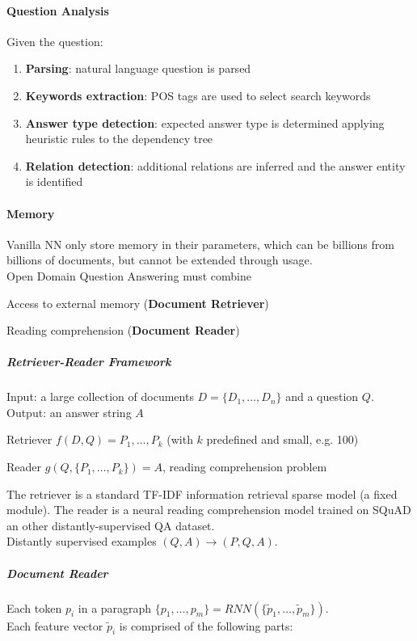 \documentclass[10pt]{report}
\begin{document}
\paragraph{Question Analysis} Given the question:
\begin{enumerate}
	\item \textbf{Parsing}: natural language question is parsed
	\item \textbf{Keywords extraction}: POS tags are used to select search keywords
	\item \textbf{Answer type detection}: expected answer type is determined applying heuristic rules to the dependency tree
	\item \textbf{Relation detection}: additional relations are inferred and the answer entity is identified
\end{enumerate}
\paragraph{Memory} Vanilla NN only store memory in their parameters, which can be billions from billions of documents, but cannot be extended through usage.\\
Open Domain Question Answering must combine\begin{list}{}{}
	\item Access to external memory (\textbf{Document Retriever})
	\item Reading comprehension (\textbf{Document Reader})
\end{list}
\subparagraph{Retriever-Reader Framework} Input: a large collection of documents $D = \{D_1,\ldots,D_n\}$ and a question $Q$.\\
Output: an answer string $A$
\begin{list}{}{}
	\item Retriever $f(D,Q) = P_1,\ldots,P_k$ (with $k$ predefined and small, e.g. 100)
	\item Reader $g(Q, \{P_1,\ldots,P_k\}) = A$, reading comprehension problem
\end{list}
The retriever is a standard TF-IDF information retrieval sparse model (a fixed module). The reader is a neural reading comprehension model trained on SQuAD an other distantly-supervised QA dataset.\\
Distantly supervised examples $(Q,A)\rightarrow (P,Q,A)$.
\subparagraph{Document Reader} Each token $p_i$ in a paragraph $\{p_1,\ldots,p_m\}=RNN(\{\tilde{p}_1,\ldots,\tilde{p}_m\})$.\\
Each feature vector $\tilde{p}_i$ is comprised of the following parts:
\end{document}
